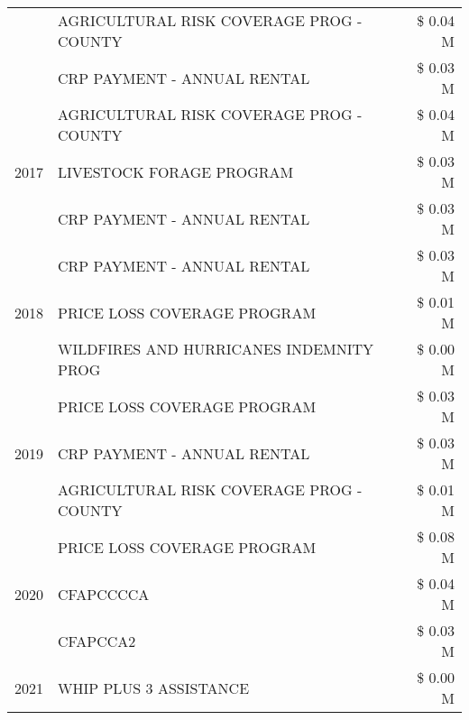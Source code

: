 \begin{tabular}{llr}
 & AGRICULTURAL RISK COVERAGE PROG - COUNTY      & \$ 0.04 M \\
 & CRP PAYMENT - ANNUAL RENTAL                   & \$ 0.03 M \\
\cline{1-3}
\multirow[t]{3}{*}{2017} & AGRICULTURAL RISK COVERAGE PROG - COUNTY & \$ 0.04 M \\
 & LIVESTOCK FORAGE PROGRAM & \$ 0.03 M \\
 & CRP PAYMENT - ANNUAL RENTAL & \$ 0.03 M \\
\cline{1-3}
\multirow[t]{3}{*}{2018} & CRP PAYMENT - ANNUAL RENTAL & \$ 0.03 M \\
 & PRICE LOSS COVERAGE PROGRAM & \$ 0.01 M \\
 & WILDFIRES AND HURRICANES INDEMNITY PROG & \$ 0.00 M \\
\cline{1-3}
\multirow[t]{3}{*}{2019} & PRICE LOSS COVERAGE PROGRAM & \$ 0.03 M \\
 & CRP PAYMENT - ANNUAL RENTAL & \$ 0.03 M \\
 & AGRICULTURAL RISK COVERAGE PROG - COUNTY & \$ 0.01 M \\
\cline{1-3}
\multirow[t]{3}{*}{2020} & PRICE LOSS COVERAGE PROGRAM & \$ 0.08 M \\
 & CFAPCCCCA & \$ 0.04 M \\
 & CFAPCCA2 & \$ 0.03 M \\
\cline{1-3}
2021 & WHIP PLUS 3 ASSISTANCE & \$ 0.00 M \\
\cline{1-3}
\bottomrule
\end{tabular}
